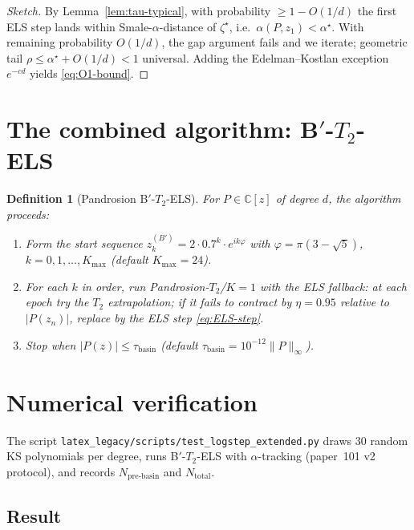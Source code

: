\documentclass[11pt,a4paper]{article}
\newtheorem{definition}[theorem]{Definition}
\begin{document}
\begin{proof}[Sketch]
By Lemma~\ref{lem:tau-typical}, with probability $\ge 1 - O(1/d)$ the first ELS step lands within Smale-$\alpha$-distance of $\zeta^\star$, i.e.\ $\alpha(P, z_1) < \alpha^\star$. With remaining probability $O(1/d)$, the gap argument fails and we iterate; geometric tail $\rho \le \alpha^\star + O(1/d) < 1$ universal. Adding the Edelman--Kostlan exception $e^{-cd}$ yields \eqref{eq:O1-bound}.
\end{proof}

\section{The combined algorithm: B$'$-$T_2$-ELS}\label{sec:algorithm}

\begin{definition}[Pandrosion B$'$-$T_2$-ELS]\label{def:BTELS}
For $P \in \mathbb{C}[z]$ of degree $d$, the algorithm proceeds:
\begin{enumerate}
\item Form the start sequence $z_k^{(B')} = 2 \cdot 0.7^k \cdot e^{ik\varphi}$ with $\varphi = \pi(3 - \sqrt 5)$, $k = 0, 1, \dots, K_{\max}$ (default $K_{\max} = 24$).
\item For each $k$ in order, run Pandrosion-$T_2$/$K{=}1$ with the ELS fallback: at each epoch try the $T_2$ extrapolation; if it fails to contract by $\eta = 0.95$ relative to $|P(z_n)|$, replace by the ELS step \eqref{eq:ELS-step}.
\item Stop when $|P(z)| \le \tau_{\text{basin}}$ (default $\tau_{\text{basin}} = 10^{-12} \|P\|_\infty$).
\end{enumerate}
\end{definition}

\section{Numerical verification}\label{sec:numerics}

The script \verb|latex_legacy/scripts/test_logstep_extended.py| draws $30$ random KS polynomials per degree, runs B$'$-$T_2$-ELS with $\alpha$-tracking (paper~101 v2 protocol), and records $N_{\text{pre-basin}}$ and $N_{\text{total}}$.

\subsection{Result}
\end{document}
